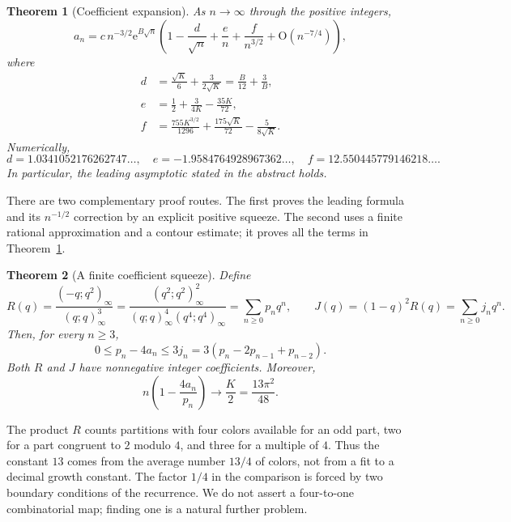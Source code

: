 \documentclass[11pt]{article}
\numberwithin{equation}{section}
\newtheorem{theorem}{Theorem}[section]
\theoremstyle{definition}\newtheorem{definition}[theorem]{Definition}
\theoremstyle{remark}\newtheorem{remark}[theorem]{Remark}
\newcommand{\OO}{\mathrm O}
\newcommand{\pp}[1]{(q;q)_{#1}}
\newcommand{\ee}{\mathrm e}
\begin{document}
\begin{theorem}[Coefficient expansion]\label{lcp:thm:main}
As $n\to\infty$ through the positive integers,
\begin{equation}\label{lcp:eq:main}
 a_n=c\,n^{-3/2}\ee^{B\sqrt n}
 \left(1-\frac{d}{\sqrt n}+\frac{e}{n}
              +\frac{f}{n^{3/2}}+\OO(n^{-7/4})\right),
\end{equation}
where
\begin{align}
 d&=\frac{\sqrt K}{6}+\frac{3}{2\sqrt K}
     =\frac B{12}+\frac3B,\label{lcp:eq:d}\\
 e&=\frac12+\frac{3}{4K}-\frac{35K}{72},\label{lcp:eq:e}\\
 f&=\frac{755K^{3/2}}{1296}+\frac{175\sqrt K}{72}
                  -\frac{5}{8\sqrt K}.\label{lcp:eq:f}
\end{align}
Numerically,
\[
 d=1.0341052176262747\ldots,\quad
 e=-1.9584764928967362\ldots,\quad
 f=12.550445779146218\ldots.
\]
In particular, the leading asymptotic stated in the abstract holds.
\end{theorem}

There are two complementary proof routes. The first proves the leading
formula and its $n^{-1/2}$ correction by an explicit positive squeeze.
The second uses a finite rational approximation and a contour estimate;
it proves all the terms in Theorem~\ref{lcp:thm:main}.

\begin{theorem}[A finite coefficient squeeze]\label{lcp:thm:squeeze}
Define
\begin{equation}\label{lcp:eq:R}
 R(q)=\frac{(-q;q^2)_\infty}{\pp{\infty}^3}
     =\frac{(q^2;q^2)_\infty^2}
            {(q;q)_\infty^4(q^4;q^4)_\infty}
     =\sum_{n\ge0}p_nq^n,
 \qquad J(q)=(1-q)^2R(q)=\sum_{n\ge0}j_nq^n.
\end{equation}
Then, for every $n\ge3$,
\begin{equation}\label{lcp:eq:squeeze}
 0\le p_n-4a_n\le3j_n
   =3(p_n-2p_{n-1}+p_{n-2}).
\end{equation}
Both $R$ and $J$ have nonnegative integer coefficients. Moreover,
\begin{equation}\label{lcp:eq:deficit}
 n\left(1-\frac{4a_n}{p_n}\right)\longrightarrow\frac K2
 =\frac{13\pi^2}{48}.
\end{equation}
\end{theorem}

The product $R$ counts partitions with four colors available for an odd
part, two for a part congruent to $2$ modulo $4$, and three for a multiple
of $4$. Thus the constant $13$ comes from the average number $13/4$ of
colors, not from a fit to a decimal growth constant. The factor $1/4$
in the comparison is forced by two boundary conditions of the recurrence.
We do not assert a four-to-one combinatorial map; finding one is a natural
further problem.
\end{document}
